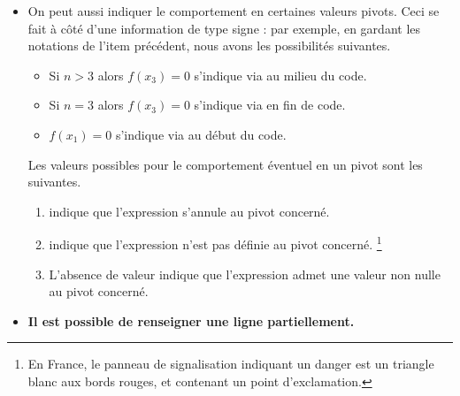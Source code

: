 \documentclass{tutodoc}
\begin{document}
\begin{enumerate}
\begin{itemize}
\begin{enumerate}
            \item \tdoclatexin{-} indique une expression négative stricte sur l'intervalle concerné.

            \item {} indique une expression nulle sur l'intervalle concerné avec  pour .

            \item {} indique une expression non définie sur l'intervalle concerné
            \footnote{
                Penser par exemple à l'expression $x \, \sqrt{x^2 - 1}$ .
            }
            avec  pour  soit .
        \end{enumerate}


        \item On peut aussi indiquer le comportement en certaines valeurs pivots. Ceci se fait à côté d'une information de type signe : par exemple, en gardant les notations de l'item précédent, nous avons les possibilités suivantes.
        \begin{itemize}[label={\scriptsize o}]
            \item Si $n > 3$ alors $f(x_3) = 0$ s'indique via  au milieu du code.

            \item Si $n = 3$ alors $f(x_3) = 0$ s'indique via  en fin de code.

            \item $f(x_1) = 0$ s'indique via     au début du code.
        \end{itemize}
        Les valeurs possibles pour le comportement éventuel en un pivot sont les suivantes.
        \begin{enumerate}
            \item {} indique que
l'expression s'annule au pivot concerné.

            \item \tdoclatexin{!} indique que
l'expression n'est pas définie au pivot concerné.
            \footnote{
                En France, le panneau de signalisation indiquant un danger est un triangle blanc aux bords rouges, et contenant un point d'exclamation.
            }

            \item L'absence de valeur indique que l'expression admet une valeur non nulle au pivot concerné.
        \end{enumerate}


    	\item \textbf{Il est possible de renseigner une ligne partiellement.}
    \end{itemize}
\end{enumerate}
\end{document}
